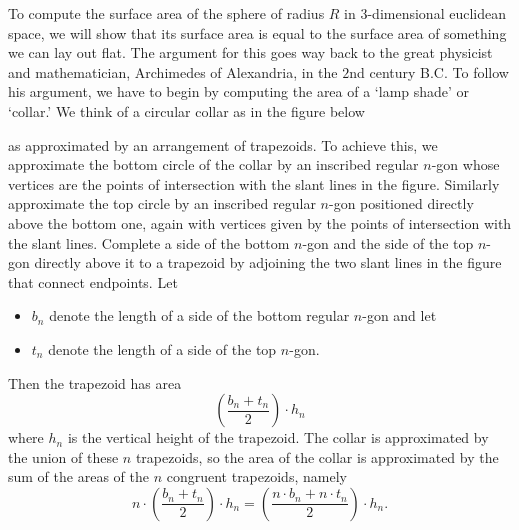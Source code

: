 \documentclass[newpage,hints,handout]{ximera}
\begin{document}
To compute the surface area of the sphere of radius $R$ in $3$-dimensional
euclidean space, we will show that its surface area is equal to the surface
area of something we can lay out flat. The argument for this goes way back to
the great physicist and mathematician, Archimedes of Alexandria, in the $2$nd
century B.C. To follow his argument, we have to begin by computing the area of
a `lamp shade' or `collar.' We think of a circular collar as in the figure
below%
\begin{image}
\end{image}
as approximated by an arrangement of trapezoids. To achieve this, we
approximate the bottom circle of the collar by an inscribed regular $n$-gon
whose vertices are the points of intersection with the slant lines in the
figure. Similarly approximate the top circle by an inscribed regular $n$-gon
positioned directly above the bottom one, again with vertices given by the
points of intersection with the slant lines. Complete a side of the bottom
$n$-gon and the side of the top $n$-gon directly above it to a trapezoid by
adjoining the two slant lines in the figure that connect endpoints. Let
\begin{itemize}
\item $b_{n}$ denote the length of a side of the bottom regular
  $n$-gon and let 
\item $t_{n}$ denote the length of a side of the top $n$-gon. 
\end{itemize}
Then the trapezoid has area
\[
\left(  \frac{b_{n}+t_{n}}{2}\right)  \cdot h_{n}%
\]
where $h_{n}$ is the vertical height of the trapezoid. The collar is
approximated by the union of these $n$ trapezoids, so the area of the collar
is approximated by the sum of the areas of the $n$ congruent trapezoids,
namely%
\[
n\cdot \left(  \frac{b_{n}+t_{n}}{2}\right)
\cdot h_{n}=\left(  \frac{n\cdot %
b_{n}+n\cdot t_{n}}{2}\right) \cdot h_{n}.
\]
\end{document}
